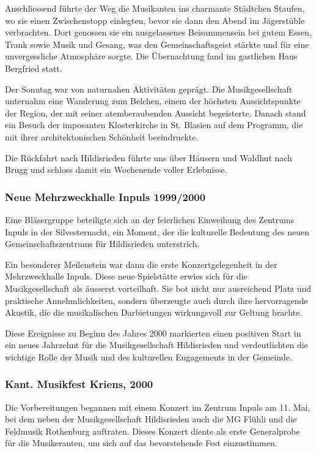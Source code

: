 \begin{history}
    Anschliessend führte der Weg die Musikanten ins charmante Städtchen Staufen,
    wo sie einen Zwischenstopp einlegten, bevor sie dann den Abend im
    Jägerstüble verbrachten. Dort genossen sie ein ausgelassenes Beisammensein
    bei gutem Essen, Trank sowie Musik und Gesang, was den Gemeinschaftsgeist
    stärkte und für eine unvergessliche Atmosphäre sorgte. Die Übernachtung fand
    im gastlichen Haus Bergfried statt.

    Der Sonntag war von naturnahen Aktivitäten geprägt. Die Musikgesellschaft
    unternahm eine Wanderung zum Belchen, einem der höchsten Aussichtspunkte der
    Region, der mit seiner atemberaubenden Aussicht begeisterte. Danach stand
    ein Besuch der imposanten Klosterkirche in St. Blasien auf dem Programm, die
    mit ihrer architektonischen Schönheit beeindruckte.

    Die Rückfahrt nach Hildisrieden führte uns über Häusern und Waldhut nach
    Brugg und schloss damit ein Wochenende voller Erlebnisse.

    \subsubsection*{Neue Mehrzweckhalle Inpuls 1999/2000}

    Eine Bläsergruppe beteiligte sich an der feierlichen Einweihung des Zentrums
    Inpuls in der Silvesternacht, ein Moment, der die kulturelle Bedeutung des
    neuen Gemeinschaftszentrums für Hildisrieden unterstrich.

    Ein besonderer Meilenstein war dann die erste Konzertgelegenheit in der
    Mehrzweckhalle Inpuls. Diese neue Spielstätte erwies sich für die
    Musikgesellschaft als äusserst vorteilhaft. Sie bot nicht nur ausreichend
    Platz und praktische Annehmlichkeiten, sondern überzeugte auch durch ihre
    hervorragende Akustik, die die musikalischen Darbietungen wirkungsvoll zur
    Geltung brachte.

    Diese Ereignisse zu Beginn des Jahres 2000 markierten einen positiven Start
    in ein neues Jahrzehnt für die Musikgesellschaft Hildisrieden und
    verdeutlichten die wichtige Rolle der Musik und des kulturellen Engagements
    in der Gemeinde.

    \subsubsection*{Kant. Musikfest Kriens, 2000}

    Die Vorbereitungen begannen mit einem Konzert im Zentrum Inpuls am 11. Mai,
    bei dem neben der Musikgesellschaft Hildisrieden auch die MG Flühli und die
    Feldmusik Rothenburg auftraten. Dieses Konzert diente als erste Generalprobe
    für die Musikeranten, um sich auf das bevorstehende Fest einzustimmen.


\end{history}
